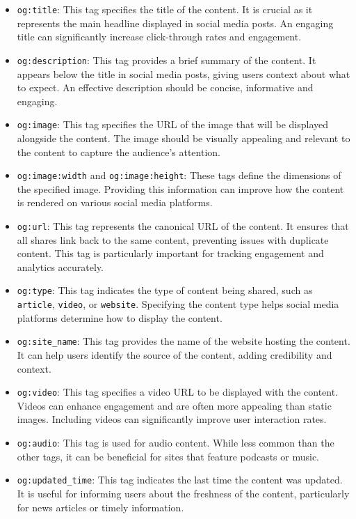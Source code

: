 \begin{itemize}
    \item \texttt{og:title}: This tag specifies the title of the content. It is crucial as it represents the main headline displayed in social media posts. An engaging title can significantly increase click-through rates and engagement.

    \item \texttt{og:description}: This tag provides a brief summary of the content. It appears below the title in social media posts, giving users context about what to expect. An effective description should be concise, informative and engaging.

    \item \texttt{og:image}: This tag specifies the URL of the image that will be displayed alongside the content. The image should be visually appealing and relevant to the content to capture the audience's attention.

    \item \texttt{og:image:width} and \texttt{og:image:height}: These tags define the dimensions of the specified image. Providing this information can improve how the content is rendered on various social media platforms.

    \item \texttt{og:url}: This tag represents the canonical URL of the content. It ensures that all shares link back to the same content, preventing issues with duplicate content. This tag is particularly important for tracking engagement and analytics accurately.

    \item \texttt{og:type}: This tag indicates the type of content being shared, such as \texttt{article}, \texttt{video}, or \texttt{website}. Specifying the content type helps social media platforms determine how to display the content. 

    \item \texttt{og:site\_name}: This tag provides the name of the website hosting the content. It can help users identify the source of the content, adding credibility and context.

    \item \texttt{og:video}: This tag specifies a video URL to be displayed with the content. Videos can enhance engagement and are often more appealing than static images. Including videos can significantly improve user interaction rates.

    \item \texttt{og:audio}: This tag is used for audio content. While less common than the other tags, it can be beneficial for sites that feature podcasts or music.

    \item \texttt{og:updated\_time}: This tag indicates the last time the content was updated. It is useful for informing users about the freshness of the content, particularly for news articles or timely information.
\end{itemize}

